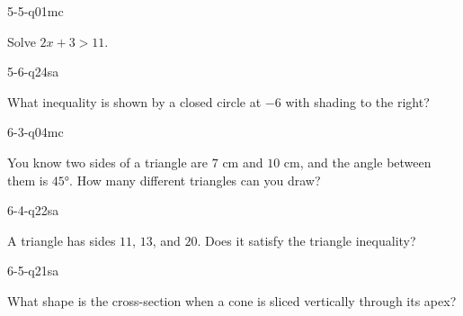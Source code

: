\begin{practiceQuestion}{5-5-q01}{mc}
\begin{questionText}
Solve $2x + 3 > 11$.
\end{questionText}
\end{practiceQuestion}

\begin{practiceQuestion}{5-6-q24}{sa}
\begin{questionText}
What inequality is shown by a closed circle at $-6$ with shading to the right?
\end{questionText}
\end{practiceQuestion}

\begin{practiceQuestion}{6-3-q04}{mc}
\begin{questionText}
You know two sides of a triangle are $7$ cm and $10$ cm, and the angle between them is $45°$. How many different triangles can you draw?
\end{questionText}
\end{practiceQuestion}

\begin{practiceQuestion}{6-4-q22}{sa}
\begin{questionText}
A triangle has sides $11$, $13$, and $20$. Does it satisfy the triangle inequality?
\end{questionText}
\end{practiceQuestion}

\begin{practiceQuestion}{6-5-q21}{sa}
\begin{questionText}
What shape is the cross-section when a cone is sliced vertically through its apex?
\end{questionText}
\end{practiceQuestion}

